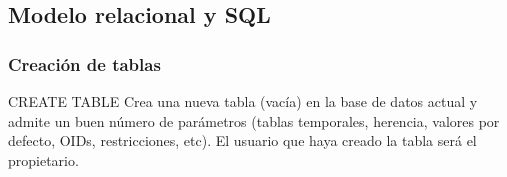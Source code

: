 \documentclass{classes/beamer_GeomaticaUA}
\begin{document}
\subsection{Modelo relacional y SQL}



\begin{frame}[fragile]
\frametitle{Creación de tablas}

\begin{block}{CREATE TABLE}
Crea una nueva tabla (vacía) en la base de datos actual y admite un buen número de parámetros (tablas temporales, herencia, valores por defecto, OIDs, restricciones, etc). El usuario que haya creado la tabla será el propietario.
\end{block}



\end{frame}
\end{document}
